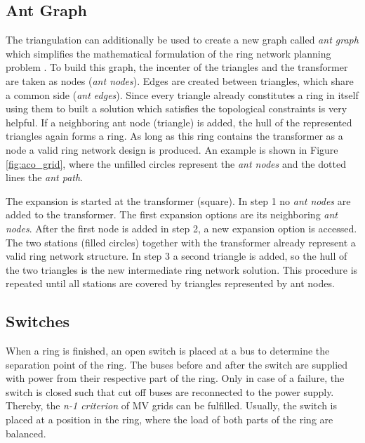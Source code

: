 \subsection{Ant Graph}\label{ant_graph}
The triangulation can additionally be used to create a new graph called \textit{ant graph} which simplifies the mathematical formulation of the ring network planning problem \cite{rotering2013zielnetzplanung}. To build this graph, the incenter of the triangles and the transformer are taken as nodes (\textit{ant nodes}). Edges are created between triangles, which share a common side (\textit{ant edges}). Since every triangle already constitutes a ring in itself using them to built a solution which satisfies the topological constraints is very helpful. If a neighboring ant node (triangle) is added, the hull of the represented triangles again forms a ring. As long as this ring contains the transformer as a node a valid ring network design is produced. An example is shown in Figure \ref{fig:aco_grid}, where the unfilled circles represent the \textit{ant nodes} and the dotted lines the \textit{ant path}.


The expansion is started at the transformer (square). In step 1 no \textit{ant nodes} are added to the transformer. The first expansion options are its neighboring \textit{ant nodes}. After the first node is added in step 2, a new expansion option is accessed. The two stations (filled circles) together with the transformer already represent a valid ring network structure. In step 3 a second triangle is added, so the hull of the two triangles is the new intermediate ring network solution. This procedure is repeated until all stations are covered by triangles represented by ant nodes.

\subsection{Switches}
When a ring is finished, an open switch is placed at a bus to determine the separation point of the ring. The buses before and after the switch are supplied with power from their respective part of the ring. Only in case of a failure, the switch is closed such that cut off buses are reconnected to the power supply. Thereby, the \textit{n-1 criterion} of MV grids can be fulfilled. Usually, the switch is placed at a position in the ring, where the load of both parts of the ring are balanced.






